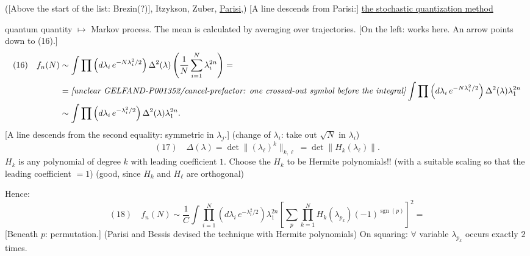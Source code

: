 ([Above the start of the list: Brezin(?)], Itzykson, Zuber, \underline{Parisi},)
[A line descends from Parisi:] \underline{the stochastic quantization method}

quantum quantity $\longmapsto$ Markov process.
The mean is calculated by averaging over trajectories.
[On the left: works here. An arrow points down to (16).]
\begin{equation*}
\begin{aligned}
(16)\quad f_n(N)&\sim\int\prod\left(d\lambda_i\,e^{-N\lambda_i^2/2}\right)\Delta^2(\lambda)
\left(\frac1N\sum_{i=1}^{N}\lambda_i^{2n}\right)=\\
&=\text{\textit{[unclear GELFAND-P001352/cancel-prefactor: one crossed-out symbol before the integral]}}
\int\prod\left(d\lambda_i\,e^{-N\lambda_i^2/2}\right)\Delta^2(\lambda)\lambda_1^{2n}\\
&\sim\int\prod\left(d\lambda_i\,e^{-\lambda_i^2/2}\right)\Delta^2(\lambda)\lambda_1^{2n}.
\end{aligned}
\end{equation*}
[A line descends from the second equality: symmetric in $\lambda_j$.]
(change of $\lambda_i$: take out  $\sqrt N$ in $\lambda_i$)
\begin{equation*}
(17)\quad \Delta(\lambda)=\det\|(\lambda_\ell)^k\|_{k,\ell}=\det\|H_k(\lambda_\ell)\|.
\end{equation*}
$H_k$ is any polynomial of degree $k$ with leading coefficient $1$.
Choose the $H_k$ to be Hermite polynomials!!
(with a suitable scaling so that the leading coefficient $=1$)
(good, since $H_k$ and $H_\ell$ are orthogonal)

Hence:
\begin{equation*}
(18)\quad f_n(N)\sim\frac1C\int\prod_{i=1}^{N}\left(d\lambda_i\,e^{-\lambda_i^2/2}\right)\lambda_1^{2n}
\left[\sum_p\prod_{k=1}^{N}H_k(\lambda_{p_k})(-1)^{\operatorname{sgn}(p)}\right]^2=
\end{equation*}
[Beneath $p$: permutation.]
(Parisi and Bessis devised the technique with Hermite polynomials)
On squaring: $\forall$ variable $\lambda_{p_k}$ occurs exactly $2$ times.



